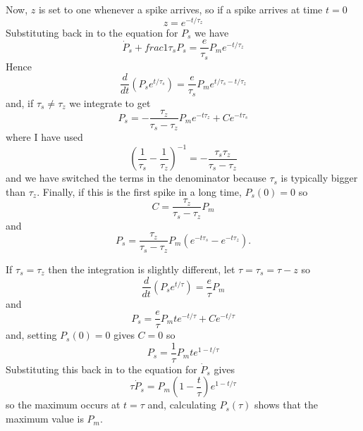 \documentclass[12pt]{article}
\begin{document}
\begin{enumerate}
Now, $z$ is set to one whenever a spike arrives, so if a spike arrives at time $t=0$ 
\begin{equation}
z=e^{-t/\tau_z}
\end{equation}
Substituting back in to the equation for $P_s$ we have
\begin{equation}
\dot{P}_s+frac{1}{\tau_s}P_s=\frac{e}{\tau_s}P_me^{-t/\tau_z}
\end{equation}
Hence
\begin{equation}
\frac{d}{dt}\left(P_se^{t/\tau_s}\right)=\frac{e}{\tau_s}P_me^{t/\tau_s-t/\tau_z}
\end{equation}
and, if $\tau_s\not=\tau_z$ we integrate to get
\begin{equation}
P_s=-\frac{\tau_z}{\tau_s-\tau_z}P_me^{-t\tau_z}+Ce^{-t\tau_s}
\end{equation}
where I have used
\begin{equation}
\left(\frac{1}{\tau_s}-\frac{1}{\tau_z}\right)^{-1}=-\frac{\tau_s\tau_z}{\tau_s-\tau_z}
\end{equation}
and we have switched the terms in the denominator because $\tau_s$ is typically bigger than $\tau_z$. Finally, if this is the first spike in a long time, $P_s(0)=0$ so 
\begin{equation}
C=\frac{\tau_z}{\tau_s-\tau_z}P_m
\end{equation}
and
\begin{equation}
P_s=\frac{\tau_z}{\tau_s-\tau_z}P_m\left(e^{-t\tau_s}-e^{-t\tau_z}\right).
\end{equation}

If $\tau_s=\tau_z$ then the integration is slightly different, let $\tau=\tau_s=\tau-z$ so
\begin{equation}
\frac{d}{dt}\left(P_s e^{t/\tau}\right)=\frac{e}{\tau}P_m
\end{equation}
and
\begin{equation}
P_s=\frac{e}{\tau}P_mt e^{-t/\tau}+Ce^{-t/\tau}
\end{equation}
and, setting $P_s(0)=0$ gives $C=0$ so
\begin{equation}
P_s=\frac{1}{\tau}P_mt e^{1-t/\tau}
\end{equation}
Substituting this back in to the equation for $\dot{P}_s$ gives
\begin{equation}
\tau\dot{P}_s=P_m\left(1-\frac{t}{\tau}\right)e^{1-t/\tau}
\end{equation}
so the maximum occurs at $t=\tau$ and, calculating $P_s(\tau)$ shows that the maximum value is $P_m$. 


\end{enumerate}
\end{document}
